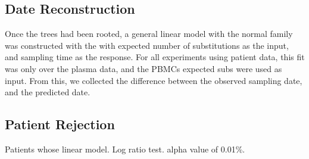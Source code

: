 \subsection{Date Reconstruction} \label{subsec:daterecon}
Once the trees had been rooted, a general linear model with the normal family was constructed with the with expected number of substitutions as the input, and sampling time as the response. For all experiments using patient data, this fit was only over the plasma data, and the PBMCs expected subs were used as input. From this, we collected the difference between the observed sampling date, and the predicted date. 


\subsection{Patient Rejection} \label{subsec:hypot}
Patients whose linear model. Log ratio test. alpha value of 0.01\%. 
